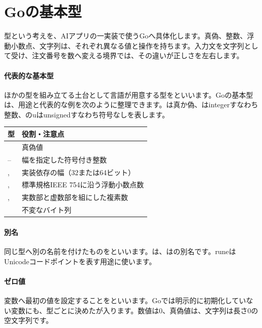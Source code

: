 \section{Goの基本型}
\label{sec:03-runtime-data-08}

型という考えを、AIアプリの一実装で使うGoへ具体化します。真偽、整数、浮動小数点、文字列は、それぞれ異なる値と操作を持ちます。入力文を文字列として受け、注文番号を数へ変える境界では、その違いが正しさを左右します。

\begingroup
\begingroup
\paragraph{代表的な基本型}
        ほかの型を組み立てる土台として言語が用意する型をといいます。Goの基本型は、用途と代表的な例を次のように整理できます。は真か偽、はintegerすなわち整数、のuはunsignedすなわち符号なしを表します。
        \begin{tabularx}{\linewidth}{@{}lY@{}}
          \toprule
          型 & 役割・注意点\\
          \midrule
           & 真偽値\\
          -- & 幅を指定した符号付き整数\\
          ,  & 実装依存の幅（32または64ビット）\\
          ,  & 標準規格IEEE 754に沿う浮動小数点数\\
          ,  & 実数部と虚数部を組にした複素数\\
           & 不変なバイト列\\
          \bottomrule
        \end{tabularx}

\par
\endgroup
\medskip
\begingroup
\paragraph{別名}
        同じ型へ別の名前を付けたものをといいます。は、はの別名です。runeはUnicodeコードポイントを表す用途に使います。

\paragraph{ゼロ値}
        変数へ最初の値を設定することをといいます。Goでは明示的に初期化していない変数にも、型ごとに決めたが入ります。数値は0、真偽値は、文字列は長さ0の空文字列です。

